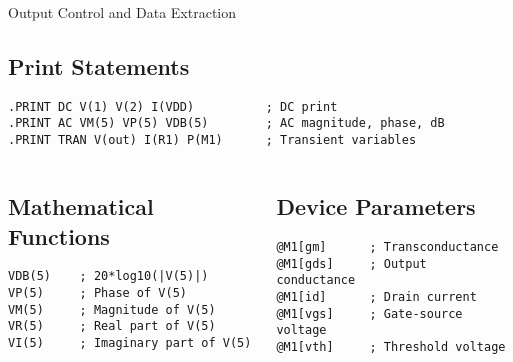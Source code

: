 \documentclass{beamer}
\begin{document}
\begin{frame}{Output Control and Data Extraction}
    \subsection{Print Statements}
    \begin{lstlisting}
.PRINT DC V(1) V(2) I(VDD)          ; DC print
.PRINT AC VM(5) VP(5) VDB(5)        ; AC magnitude, phase, dB
.PRINT TRAN V(out) I(R1) P(M1)      ; Transient variables
    \end{lstlisting}
    
    \begin{columns}
        \begin{column}{0.5\textwidth}
            \subsection{Mathematical Functions}
            \begin{lstlisting}
VDB(5)    ; 20*log10(|V(5)|)
VP(5)     ; Phase of V(5)
VM(5)     ; Magnitude of V(5)
VR(5)     ; Real part of V(5)
VI(5)     ; Imaginary part of V(5)
            \end{lstlisting}
        \end{column}
        \begin{column}{0.5\textwidth}
            \subsection{Device Parameters}
            \begin{lstlisting}
@M1[gm]      ; Transconductance
@M1[gds]     ; Output conductance
@M1[id]      ; Drain current
@M1[vgs]     ; Gate-source voltage
@M1[vth]     ; Threshold voltage
            \end{lstlisting}
        \end{column}
    \end{columns}
\end{frame}
\end{document}
